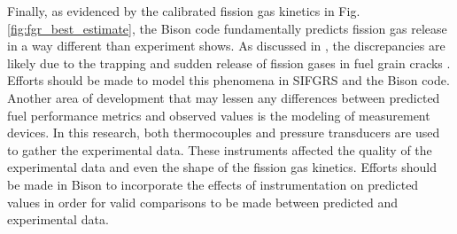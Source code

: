 Finally, as evidenced by the calibrated fission gas kinetics in Fig. \ref{fig:fgr_best_estimate}, the Bison code fundamentally predicts fission gas release in a way different than experiment shows. As discussed in \cite{Pastore}, the discrepancies are likely due to the trapping and sudden release of fission gases in fuel grain cracks \cite{Pastore}. Efforts should be made to model this phenomena in \ac{SIFGRS} and the Bison code. Another area of development that may lessen any differences between predicted fuel performance metrics and observed values is the modeling of measurement devices. In this research, both thermocouples and pressure transducers are used to gather the experimental data. These instruments affected the quality of the experimental data and even the shape of the fission gas kinetics. Efforts should be made in Bison to incorporate the effects of instrumentation on predicted values in order for valid comparisons to be made between predicted and experimental data.        

